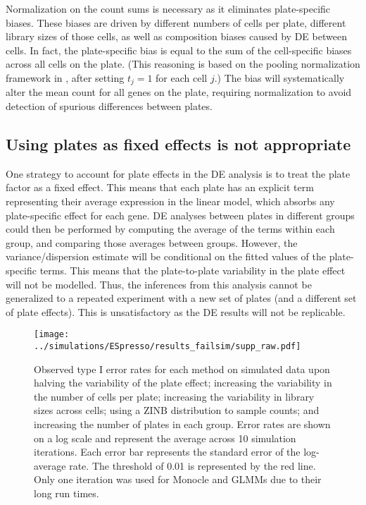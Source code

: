 \documentclass{article}
\begin{document}
Normalization on the count sums is necessary as it eliminates plate-specific biases.
These biases are driven by different numbers of cells per plate, different library sizes of those cells, as well as composition biases caused by DE between cells.
In fact, the plate-specific bias is equal to the sum of the cell-specific biases across all cells on the plate.
(This reasoning is based on the pooling normalization framework in \cite{lun2016pooling}, after setting $t_j=1$ for each cell $j$.)
The bias will systematically alter the mean count for all genes on the plate, requiring normalization to avoid detection of spurious differences between plates.

\subsection{Using plates as fixed effects is not appropriate}
One strategy to account for plate effects in the DE analysis is to treat the plate factor as a fixed effect.
This means that each plate has an explicit term representing their average expression in the linear model, which absorbs any plate-specific effect for each gene.
DE analyses between plates in different groups could then be performed by computing the average of the terms within each group, and comparing those averages between groups.
However, the variance/dispersion estimate will be conditional on the fitted values of the plate-specific terms.
This means that the plate-to-plate variability in the plate effect will not be modelled.
Thus, the inferences from this analysis cannot be generalized to a repeated experiment with a new set of plates (and a different set of plate effects).
This is unsatisfactory as the DE results will not be replicable.

\begin{figure}[p]
    \begin{center}
        \texttt{[image: ../simulations/ESpresso/results\_failsim/supp\_raw.pdf]}
    \end{center}
    \caption{    
        Observed type I error rates for each method on simulated data upon halving the variability of the plate effect; increasing the variability in the number of cells per plate; increasing the variability in library sizes across cells; using a ZINB distribution to sample counts; and increasing the number of plates in each group.
        Error rates are shown on a log scale and represent the average across 10 simulation iterations.
        Each error bar represents the standard error of the log-average rate.
        The threshold of 0.01 is represented by the red line.
        Only one iteration was used for Monocle and GLMMs due to their long run times.
    }
    \label{fig:extrafail}
\end{figure}
\end{document}
